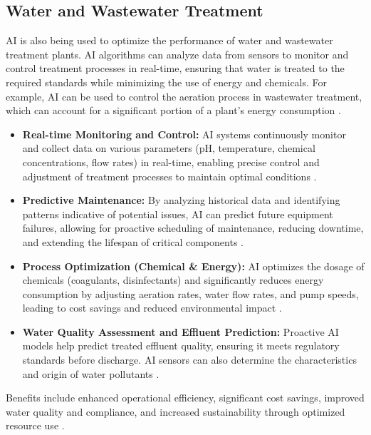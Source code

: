 \subsection{Water and Wastewater Treatment}
AI is also being used to optimize the performance of water and wastewater treatment plants. AI algorithms can analyze data from sensors to monitor and control treatment processes in real-time, ensuring that water is treated to the required standards while minimizing the use of energy and chemicals. For example, AI can be used to control the aeration process in wastewater treatment, which can account for a significant portion of a plant's energy consumption \cite{satoh2023can}.
\begin{itemize}
    \item \textbf{Real-time Monitoring and Control:} AI systems continuously monitor and collect data on various parameters (pH, temperature, chemical concentrations, flow rates) in real-time, enabling precise control and adjustment of treatment processes to maintain optimal conditions \cite{NACWA_WaterTreatment, SaveTheWater_WaterTreatment}.
    \item \textbf{Predictive Maintenance:} By analyzing historical data and identifying patterns indicative of potential issues, AI can predict future equipment failures, allowing for proactive scheduling of maintenance, reducing downtime, and extending the lifespan of critical components \cite{WSP_WaterTreatment, CleanTechWater_WaterTreatment}.
    \item \textbf{Process Optimization (Chemical \& Energy):} AI optimizes the dosage of chemicals (coagulants, disinfectants) and significantly reduces energy consumption by adjusting aeration rates, water flow rates, and pump speeds, leading to cost savings and reduced environmental impact \cite{JEMSGroup_WaterTreatment, FSStudio_WaterTreatment}.
    \item \textbf{Water Quality Assessment and Effluent Prediction:} Proactive AI models help predict treated effluent quality, ensuring it meets regulatory standards before discharge. AI sensors can also determine the characteristics and origin of water pollutants \cite{WaterManAustralia_WaterTreatment}.
\end{itemize}
Benefits include enhanced operational efficiency, significant cost savings, improved water quality and compliance, and increased sustainability through optimized resource use \cite{WhiteCase_WaterTreatment_2}.

